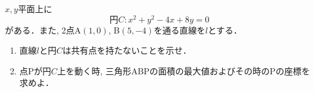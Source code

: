 \documentclass[8pt,dvipdfmx]{article}[b5paper]
\begin{document}
\begin{tcolorbox}[title=数学\textcircled{1} 4-6 C]
\(x, y\)平面上に
\[
\text{円}C: x^2 + y^2 - 4x + 8y = 0
\]
がある．また, 2点A\((1,0)\), B\((5,-4)\)を通る直線を$l$とする．
\begin{enumerate}[(1)]
    \item 直線$l$と円$C$は共有点を持たないことを示せ．
    \item 点Pが円$C$上を動く時, 三角形ABPの面積の最大値およびその時のPの座標を求めよ．
\end{enumerate}
\end{tcolorbox}
\end{document}
